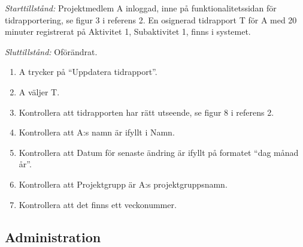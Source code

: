 \documentclass[a4paper]{article}
\begin{document}
\begin{FT}
\emph{Starttillstånd:} Projektmedlem A inloggad, inne på funktionalitetssidan för tidrapportering, se figur 3 i referens 2. En osignerad tidrapport T för A med 20 minuter registrerat på Aktivitet 1, Subaktivitet 1, finns i systemet.

\emph{Sluttillstånd:} Oförändrat.

\begin{enumerate}
\item A trycker på ``Uppdatera tidrapport''.
\item A väljer T.
\item Kontrollera att tidrapporten har rätt utseende, se figur 8 i referens 2.
\item Kontrollera att A:s namn är ifyllt i Namn.
\item Kontrollera att Datum för senaste ändring är ifyllt på formatet ``dag månad år''.
\item Kontrollera att Projektgrupp är A:s projektgruppsnamn.
\item Kontrollera att det finns ett veckonummer.
\end{enumerate}

\end{FT}






\subsection{Administration}
\end{document}

